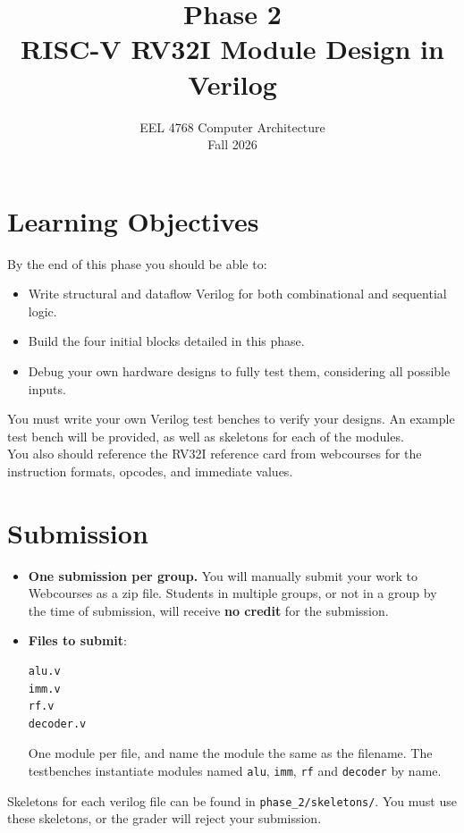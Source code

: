 \documentclass[11pt]{article}
\title{\vspace{-1.5cm}\textbf{Phase 2}\\[2pt]\Large RISC-V RV32I Module Design in Verilog}
\author{EEL 4768 Computer Architecture \\ Fall 2026}
\date{}
\begin{document}
\maketitle
\thispagestyle{fancy}
\vspace{-1cm}

\section*{Learning Objectives}
By the end of this phase you should be able to:
\begin{itemize}
  \item Write structural and dataflow Verilog for both combinational and sequential logic.
  \item Build the four initial blocks detailed in this phase.
  \item Debug your own hardware designs to fully test them, considering all possible inputs.
\end{itemize}

\begin{important}
You must write your own Verilog test benches to verify your designs. An example test bench will be provided, as well as skeletons for each of the modules.
\\
You also should reference the RV32I reference card from webcourses for the instruction formats, opcodes, and immediate values.
\end{important}

\section{Submission}
\begin{itemize}
  \item \textbf{One submission per group.} You will manually
        submit your work to Webcourses as a zip file. Students in multiple
        groups, or not in a group by the time of submission, will receive
        \textbf{no credit} for the submission.
  \item \textbf{Files to submit}:
\begin{lstlisting}
alu.v
imm.v
rf.v
decoder.v
\end{lstlisting}
        One module per file, and name the module the same as the filename. The testbenches instantiate modules
        named \texttt{alu}, \texttt{imm}, \texttt{rf} and \texttt{decoder} by
        name.
\end{itemize}

\begin{important}
  Skeletons for each verilog file can be found in \texttt{phase\_2/skeletons/}. You must use these skeletons, or the grader will reject your submission.
\end{important}
\end{document}
